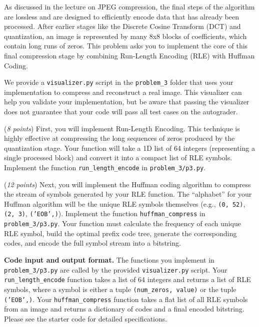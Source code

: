 \documentclass{hw}
\newcommand{\io}{\textbf{Code input and output format.} }
\begin{document}
\newpage
%
\begin{problem}
As discussed in the lecture on JPEG compression, the final steps of the algorithm are lossless and are designed to efficiently encode data that has already been processed. After earlier stages like the Discrete Cosine Transform (DCT) and quantization, an image is represented by many 8x8 blocks of coefficients, which contain long runs of zeros. This problem asks you to implement the core of this final compression stage by combining Run-Length Encoding (RLE) with Huffman Coding.

We provide a \texttt{visualizer.py} script in the \texttt{problem\_3} folder that uses your implementation to compress and reconstruct a real image. This visualizer can help you validate your implementation, but be aware that passing the visualizer does not guarantee that your code will pass all test cases on the autograder.

\begin{subproblem}
  (\textit{8 points})
  First, you will implement Run-Length Encoding. This technique is highly effective at compressing the long sequences of zeros produced by the quantization stage. Your function will take a 1D list of 64 integers (representing a single processed block) and convert it into a compact list of RLE symbols. Implement the function \texttt{run\_length\_encode} in \texttt{problem\_3/p3.py}.
\end{subproblem}

\begin{subproblem}
  (\textit{12 points})
  Next, you will implement the Huffman coding algorithm to compress the stream of symbols generated by your RLE function. The ``alphabet'' for your Huffman algorithm will be the unique RLE symbols themselves (e.g., \texttt{(0, 52)}, \texttt{(2, 3)}, \texttt{('EOB',)}). Implement the function \texttt{huffman\_compress} in \texttt{problem\_3/p3.py}. Your function must calculate the frequency of each unique RLE symbol, build the optimal prefix code tree, generate the corresponding codes, and encode the full symbol stream into a bitstring.
\end{subproblem}

\io The functions you implement in \texttt{problem\_3/p3.py} are called by the provided \texttt{visualizer.py} script. Your \texttt{run\_length\_encode} function takes a list of 64 integers and returns a list of RLE symbols, where a symbol is either a tuple \texttt{(num\_zeros, value)} or the tuple \texttt{('EOB',)}. Your \texttt{huffman\_compress} function takes a flat list of all RLE symbols from an image and returns a dictionary of codes and a final encoded bitstring. Please see the starter code for detailed specifications.
\end{problem}
\newpage
\newpage
\end{document}
